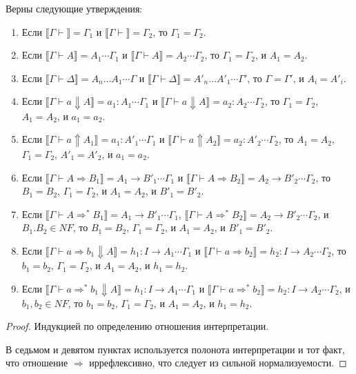 \documentclass{amsart}
\theoremstyle{definition}
\theoremstyle{remark}
\newcommand{\red}{\Rightarrow}
\renewcommand{\ll}{\llbracket}
\newcommand{\rr}{\rrbracket}
\numberwithin{figure}{section}
\begin{document}
\begin{lem}
Верны следующие утверждения:
\begin{enumerate}
\item Если $\ll \Gamma \vdash \rr = \Gamma_1$ и $\ll \Gamma \vdash \rr = \Gamma_2$, то $\Gamma_1 = \Gamma_2$.
\item Если $\ll \Gamma \vdash A \rr = A_1 \dotsb \Gamma_1$ и $\ll \Gamma \vdash A \rr = A_2 \dotsb \Gamma_2$, то $\Gamma_1 = \Gamma_2$, и $A_1 = A_2$.
\item Если $\ll \Gamma \vdash \Delta \rr = A_n \ldots A_1 \dotsb \Gamma$ и $\ll \Gamma \vdash \Delta \rr = A'_n \ldots A'_1 \dotsb \Gamma'$, то $\Gamma = \Gamma'$, и $A_i = A'_i$.
\item Если $\ll \Gamma \vdash a \Downarrow A \rr = a_1 : A_1 \dotsb \Gamma_1$ и $\ll \Gamma \vdash a \Downarrow A \rr = a_2 : A_2 \dotsb \Gamma_2$, то $\Gamma_1 = \Gamma_2$, $A_1 = A_2$, и $a_1 = a_2$.
\item Если $\ll \Gamma \vdash a \Uparrow A_1 \rr = a_1 : A'_1 \dotsb \Gamma_1$ и $\ll \Gamma \vdash a \Uparrow A_2 \rr = a_2 : A'_2 \dotsb \Gamma_2$, то $A_1 = A_2$, $\Gamma_1 = \Gamma_2$, $A'_1 = A'_2$, и $a_1 = a_2$.
\item Если $\ll \Gamma \vdash A \red B_1 \rr = A_1 \to B'_1 \dotsb \Gamma_1$ и $\ll \Gamma \vdash A \red B_2 \rr = A_2 \to B'_2 \dotsb \Gamma_2$, то $B_1 = B_2$, $\Gamma_1 = \Gamma_2$, и $A_1 = A_2$, и $B'_1 = B'_2$.
\item Если $\ll \Gamma \vdash A \red^* B_1 \rr = A_1 \to B'_1 \dotsb \Gamma_1$, $\ll \Gamma \vdash A \red^* B_2 \rr = A_2 \to B'_2 \dotsb \Gamma_2$, и $B_1. B_2 \in NF$, то $B_1 = B_2$, $\Gamma_1 = \Gamma_2$, и $A_1 = A_2$, и $B'_1 = B'_2$.
\item Если $\ll \Gamma \vdash a \red b_1 \Downarrow A \rr = h_1 : I \to A_1 \dotsb \Gamma_1$ и $\ll \Gamma \vdash a \red b_2 \rr = h_2 : I \to A_2 \dotsb \Gamma_2$, то $b_1 = b_2$, $\Gamma_1 = \Gamma_2$, и $A_1 = A_2$, и $h_1 = h_2$.
\item Если $\ll \Gamma \vdash a \red^* b_1 \Downarrow A \rr = h_1 : I \to A_1 \dotsb \Gamma_1$ и $\ll \Gamma \vdash a \red^* b_2 \rr = h_2 : I \to A_2 \dotsb \Gamma_2$, и $b_1, b_2 \in NF$, то $b_1 = b_2$, $\Gamma_1 = \Gamma_2$, и $A_1 = A_2$, и $h_1 = h_2$.
\end{enumerate}
\end{lem}
\begin{proof}
Индукцией по определению отношения интерпретации.

В седьмом и девятом пунктах используется полонота интерпретации и тот факт, что отношение $\red$ иррефлексивно, что следует из сильной нормализуемости.
\end{proof}
\end{document}
